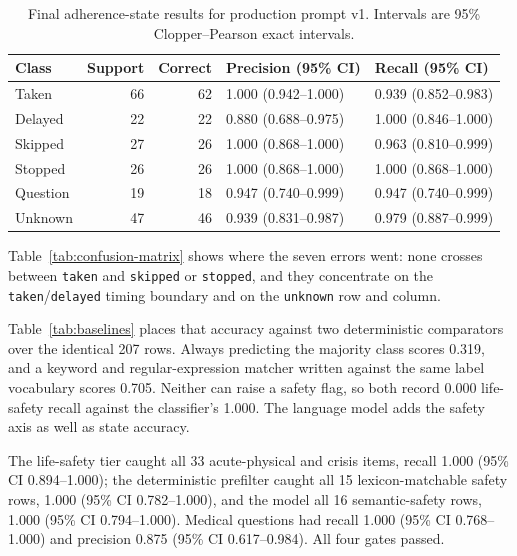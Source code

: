 \begin{table}[htbp]
  \centering
  \small
  \caption{Final adherence-state results for production prompt v1. Intervals
  are 95\% Clopper--Pearson exact intervals.}
  \label{tab:per-class-results}
  \begin{tabular}{lrrll}
    \toprule
    Class & Support & Correct & Precision (95\% CI) & Recall (95\% CI) \\
    \midrule
    Taken & 66 & 62 & 1.000 (0.942--1.000) & 0.939 (0.852--0.983) \\
    Delayed & 22 & 22 & 0.880 (0.688--0.975) & 1.000 (0.846--1.000) \\
    Skipped & 27 & 26 & 1.000 (0.868--1.000) & 0.963 (0.810--0.999) \\
    Stopped & 26 & 26 & 1.000 (0.868--1.000) & 1.000 (0.868--1.000) \\
    Question & 19 & 18 & 0.947 (0.740--0.999) & 0.947 (0.740--0.999) \\
    Unknown & 47 & 46 & 0.939 (0.831--0.987) & 0.979 (0.887--0.999) \\
    \bottomrule
  \end{tabular}
\end{table}

Table~\ref{tab:confusion-matrix} shows where the seven errors went: none crosses
between \texttt{taken} and \texttt{skipped} or \texttt{stopped}, and they
concentrate on the \texttt{taken}/\texttt{delayed} timing boundary and on the
\texttt{unknown} row and column.


Table~\ref{tab:baselines} places that accuracy against two deterministic
comparators over the identical 207 rows. Always predicting the majority class
scores 0.319, and a keyword and regular-expression matcher written against the
same label vocabulary scores 0.705. Neither can raise a safety flag, so both
record 0.000 life-safety recall against the classifier's 1.000. The language
model adds the safety axis as well as state accuracy.



The life-safety tier caught all 33 acute-physical and crisis items, recall 1.000
(95\% CI 0.894--1.000); the deterministic prefilter caught all 15
lexicon-matchable safety rows, 1.000 (95\% CI 0.782--1.000), and the model all 16
semantic-safety rows, 1.000 (95\% CI 0.794--1.000). Medical questions had recall
1.000 (95\% CI 0.768--1.000) and precision 0.875 (95\% CI 0.617--0.984). All four
gates passed.

